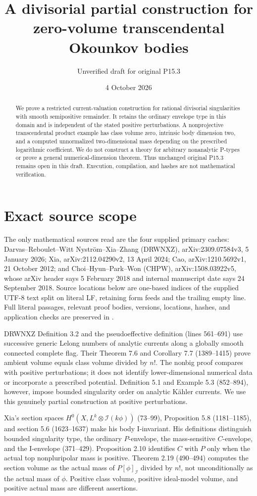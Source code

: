 \documentclass[11pt]{article}
\title{A divisorial partial construction for zero-volume transcendental Okounkov bodies}
\author{Unverified draft for original P15.3}
\date{4 October 2026}
\begin{document}
\maketitle
\begin{abstract}
We prove a restricted current-valuation construction for rational divisorial singularities with smooth semipositive remainder. It retains the ordinary envelope type in this domain and is independent of the stated positive perturbations. A nonprojective transcendental product example has class volume zero, intrinsic body dimension two, and a computed unnormalized two-dimensional mass depending on the prescribed logarithmic coefficient. We do not construct a theory for arbitrary nonanalytic P-types or prove a general numerical-dimension theorem. Thus unchanged original P15.3 remains open in this draft. Execution, compilation, and hashes are not mathematical verification.
\end{abstract}

\section{Exact source scope}
The only mathematical sources read are the four supplied primary caches: Darvas--Reboulet--Witt Nystr\"om--Xia--Zhang (DRWNXZ), arXiv:2309.07584v3, 5 January 2026; Xia, arXiv:2112.04290v2, 13 April 2024; Cao, arXiv:1210.5692v1, 21 October 2012; and Choi--Hyun--Park--Won (CHPW), arXiv:1508.03922v5, whose arXiv header says 5 February 2018 and internal manuscript date says 24 September 2018. Source locations below are one-based indices of the supplied UTF-8 text split on literal LF, retaining form feeds and the trailing empty line. Full literal passages, relevant proof bodies, versions, locations, hashes, and application checks are preserved in .

DRWNXZ Definition 3.2 and the pseudoeffective definition (lines 561--691) use successive generic Lelong numbers of analytic currents along a globally smooth connected complete flag. Their Theorem 7.6 and Corollary 7.7 (1389--1415) prove ambient volume equals class volume divided by $n!$. The nonbig proof compares with positive perturbations; it does not identify lower-dimensional numerical data or incorporate a prescribed potential. Definition 5.1 and Example 5.3 (852--894), however, impose bounded singularity order on analytic K\"ahler currents. We use this genuinely partial construction at positive perturbations.

Xia's section spaces $H^0(X,L^k\otimes\mathcal I(k\phi))$ (73--99), Proposition 5.8 (1181--1185), and section 5.6 (1623--1637) make his body I-invariant. His definitions distinguish bounded singularity type, the ordinary $P$-envelope, the mass-sensitive $C$-envelope, and the I-envelope (371--429). Proposition 2.10 identifies $C$ with $P$ only when the actual top nonpluripolar mass is positive. Theorem 2.19 (490--494) computes the section volume as the actual mass of $P[\phi]_{\mathcal I}$ divided by $n!$, not unconditionally as the actual mass of $\phi$. Positive class volume, positive ideal-model volume, and positive actual mass are different assertions.
\end{document}

